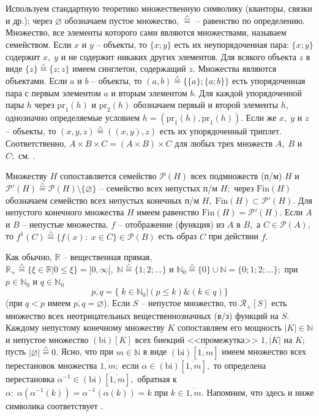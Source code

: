 \documentclass[10pt]{SPIIRAS_Proceedings}
\begin{document}
Используем стандартную теоретико множественную символику
(кванторы, связки и др.);
через $\varnothing$ обозначаем пустое множество,
$\stackrel{\triangle}{=}$ -- равенство по определению.
Множество, все элементы которого сами являются множествами,
называем семейством.
Если $x$ и $y$ -- объекты,
то $\{x;y\}$
есть их неупорядоченная пара:
$\{x;y\}$ содержит $x,\;y$
и не содержит никаких других элементов.
Для всякого объекта $z$ в виде $\{z\} \stackrel{\triangle}{=} \{z;z\}$
имеем синглетон,
содержащий $z$.
Множества являются объектами.
Если $a$ и $b$ -- объекты, то
\cite[c.~67]{15}
$(a,b) \stackrel{\triangle}{=} \{\{a\};\{a;b\}\}$
есть упорядоченная пара с первым элементом $a$ и вторым элементом $b$.
Для каждой упорядоченной пары $h$ через
$\mathrm{pr}_1(h)$ и $\mathrm{pr}_2(h)$
обозначаем первый и второй элементы $h$,
однозначно определяемые условием
$h = (\mathrm{pr} _1(h),\mathrm{pr} _1(h))$.
Если же $x,\;y$ и $z$ -- объекты,
то $(x,y,z) \stackrel{\triangle}{=} ((x,y),z)$
есть их упорядоченный триплет.
Соответственно,
$A \times B \times C = (A \times B) \times C$
для любых трех множеств $A,\;B$ и $C;$ см.
\cite[c.17]{16}.

Множеству $H$
сопоставляется семейство $\mathcal{P}(H)$
всех подмножеств (п/м) $H$
и $\mathcal{P}'(H) \stackrel{\triangle}{=}
\mathcal{P}(H) \setminus \{\varnothing\}$ -- семейство всех непустых п/м $H;$
через $\mathrm{Fin}(H)$
обозначаем семейство всех непустых конечных п/м
$H,\;\mathrm{Fin}(H) \subset \mathcal{P}'(H).$
Для непустого конечного множества $H$ имеем равенство
$\mathrm{Fin}(H) = \mathcal{P}'(H).$
Если $A$ и $B$ -- непустые множества,
$f$ -- отображение (функция) из $A$ в $B,$
а $C \in \mathcal{P}(A),$ то
$f^1(C) \stackrel{\triangle}{=} \{f(x):\;x \in C\} \in \mathcal{P}(B)$
есть образ $C$ при действии $f.$

Как обычно,
$\mathbb{R}$ -- вещественная прямая,
$\mathbb{R}_+ \stackrel{\triangle}{=} \{\xi \in \mathbb{R} \vert 0 \le \xi\} = [0,\infty[,\;\mathbb{N} \stackrel{\triangle}{=} \{1;2;...\}$
и $\mathbb{N}_0 \stackrel{\triangle}{=} \{0\} \cup \mathbb{N} = \{0;1;2;...\};$
при $p \in \mathbb{N}_0$ и $q \in \mathbb{N}_0$
$$
\overline{p,q} = \{\;k \in \mathbb{N}_0 \vert (p \le k) \& (k \in q)\}
$$
(при $q < p$ имеем $\overline{p,q} = \varnothing$).
Если $S$ -- непустое множество, то
$\mathcal{R}_+[S]$
есть множество всех неотрицательных вещественнозначных (в/з) функций на $S.$
Каждому непустому конечному множеству $K$
сопоставляем его мощность $|K| \in \mathbb{N}$
и непустое множество $(\mathrm{bi})[K]$
всех биекций
\cite[c.~87]{17} <<промежутка>>
$\overline{1,|K|}$ на $K;$
пусть
$|\varnothing| \stackrel{\triangle}{=} 0.$
Ясно, что при
$m \in \mathbb{N}$ в виде $(\mathrm{bi})[\overline{1,m}]$
имеем множество всех перестановок
\cite[c.~87]{17} множества
$\overline{1,m};$
если $\alpha \in (\mathrm{bi})[\overline{1,m}],$
то определена перестановка
$\alpha^{-1} \in (\mathrm{bi})[\overline{1,m}],$
обратная к
$\alpha:\;\alpha(\alpha^{-1}(k)) = \alpha^{-1}(\alpha(k)) = k$
при $k \in \overline{1,m}.$
Напомним, что здесь и ниже символика соответствует
\cite[$\S$3.1]{4}.
\end{document}
